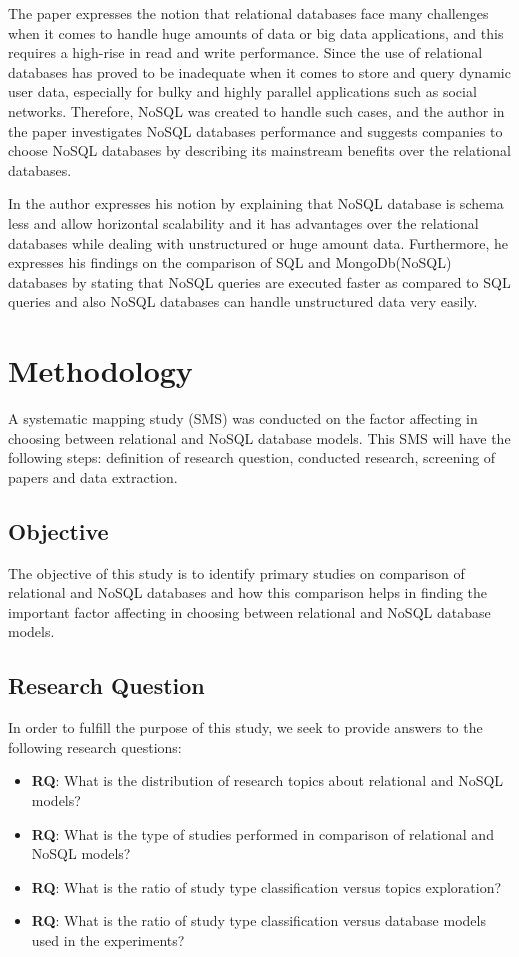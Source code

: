 \documentclass[sigconf,nonacm]{acmart}
\begin{document}
The paper \cite{19} expresses the notion that relational databases face many challenges when it comes to handle huge amounts of data or big data applications, and this requires a high-rise in read and write performance. Since the use of relational databases has proved to be inadequate when it comes to store and query dynamic user data, especially for bulky and highly parallel applications such as social networks. Therefore, NoSQL was created to handle such cases, and the author in the paper investigates NoSQL databases performance and suggests companies to choose NoSQL databases by describing its mainstream benefits over the relational databases.

In \cite{20} the author expresses his notion by explaining that NoSQL database is schema less and allow horizontal scalability and it has advantages over the relational databases while dealing with unstructured or huge amount data. Furthermore, he expresses his findings on the comparison of SQL and MongoDb(NoSQL) databases by stating that NoSQL queries are executed faster as compared to SQL queries and also NoSQL databases can handle unstructured data very easily.

\section{Methodology}
A systematic mapping study (SMS) was conducted on the factor affecting in choosing between relational and NoSQL database models. This SMS will have the following steps: definition of research question, conducted research, screening of papers and data extraction.
\subsection{Objective}
The objective of this study is to identify primary studies on comparison of relational and NoSQL databases and how this comparison helps in finding the important factor affecting in choosing between relational and NoSQL database models.
\subsection{Research Question}
In order to fulfill the purpose of this study, we seek to provide answers to the following research questions: 
\begin{itemize}
\item \textbf{RQ}: What is the distribution of research topics about relational and NoSQL models?	
\item \textbf{RQ}: What is the type of studies performed in comparison of  relational and NoSQL models?
\item \textbf{RQ}: What is the ratio of study type classification versus topics exploration?
\item \textbf{RQ}: What is the ratio of study type classification versus database models used in the experiments?
\end{itemize}
\end{document}

